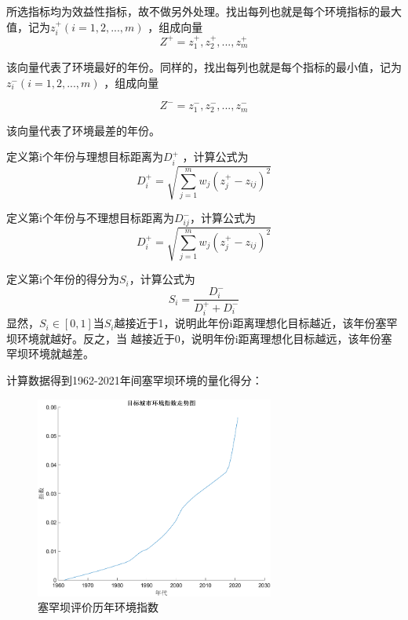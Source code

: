 \documentclass[UTF8]{ctexart}
\begin{document}
所选指标均为效益性指标，故不做另外处理。找出每列也就是每个环境指标的最大值，记为$z_i^+(i=1,2,...,m)$ ，组成向量
\begin{equation}
    Z^+={z_1^+,z_2^+,...,z_m^+}
\end{equation}

该向量代表了环境最好的年份。同样的，找出每列也就是每个指标的最小值，记为$z_i^-(i=1,2,...,m)$ ，组成向量

\begin{equation}
    Z^-={z_1^-,z_2^-,...,z_m^-}
\end{equation}

该向量代表了环境最差的年份。

定义第i个年份与理想目标距离为$D_i^+$ ，计算公式为
\begin{equation}
    D_i^+=\sqrt{\sum_{j=1}^{m}{w_j(z_j^+-z_{ij})^2}}
\end{equation}

定义第i个年份与不理想目标距离为$D_{ij}^-$，计算公式为
\begin{equation}
    D_i^+=\sqrt{\sum_{j=1}^{m}{w_j(z_j^+-z_{ij})^2}}
\end{equation}

定义第i个年份的得分为$S_i$，计算公式为
\begin{equation}
    S_i=\frac{D_i^-}{D_i^++D_i^-}
\end{equation}
显然，$S_i\in[0,1]$当$S_i$越接近于1，说明此年份i距离理想化目标越近，该年份塞罕坝环境就越好。反之，当 越接近于0，说明年份i距离理想化目标越远，该年份塞罕坝环境就越差。

计算数据得到1962-2021年间塞罕坝环境的量化得分：

\begin{figure}[H] %
    \centering %
    \includegraphics[width=0.7\textwidth]{saihanba.png} %
    \caption{塞罕坝评价历年环境指数} 
\end{figure}
\end{document}
